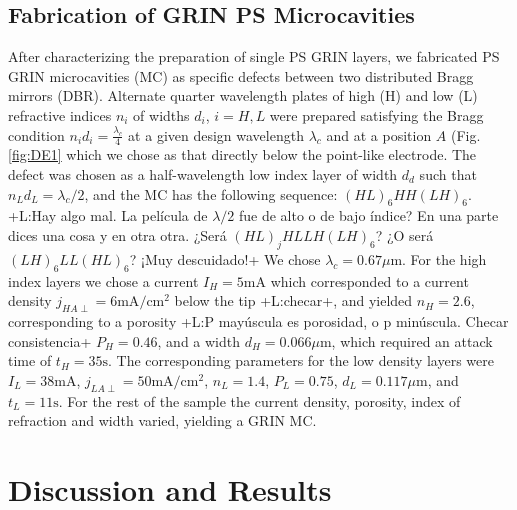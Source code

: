 \documentclass{article}
\newcommand{\notaL}[1]{{\color{blue}+L:#1+}}
\begin{document}
\subsection{Fabrication  of GRIN PS Microcavities}
After characterizing the preparation of single PS GRIN layers, we
fabricated PS GRIN microcavities (MC) as specific defects between two distributed Bragg
mirrors  (DBR). Alternate quarter wavelength plates of high (H) and low (L)
refractive indices $n_i$ of widths $d_i$, $i=H,L$ were prepared satisfying the Bragg condition
$n_id_i=\frac{\lambda_c}{4}$ at a given design
wavelength $\lambda_c$ and at a position $A$ (Fig. \ref{fig:DE1} which
we chose as that directly below the point-like electrode. The defect
was chosen as a half-wavelength low index layer of width $d_d$ such that
$n_Ld_L=\lambda_c/2$, and the MC has the
following sequence: $(HL)_6HH(LH )_6$. \notaL{Hay algo mal. La
  película de $\lambda/2$ fue de alto o de bajo índice? En una parte
  dices una cosa y en otra otra. ¿Será $(HL)_jHLLH(LH)_6$? ¿O será
  $(LH)_6LL(HL)_6$? ¡Muy descuidado!}
We chose $\lambda_c= 0.67 \mu\text{m}$. For the high index layers we
chose a current $I_H=5\text{mA}$ which corresponded to a current density
$j_{HA\perp}= 6\text{mA}/\text{cm}^2$ below the tip \notaL{checar}, and yielded
$n_H =2.6$, corresponding to a porosity \notaL{P mayúscula
  es porosidad, o p minúscula. Checar consistencia} $P_H =0.46$, and a
width $d_H=0.066 \mu\text{m}$, which required an attack time of
$t_H=35 \text{s}$. The corresponding parameters for the low density
layers were $I_L=38\text{mA}$, $j_{LA\perp}=50\text{mA}/\text{cm}^2$, $n_L= 1.4$,  $P_L =0.75$,
$d_L=0.117 \mu \text{m}$, and $t_L=11 \text{s}$. For the rest of the
sample the current density, porosity, index of refraction and width
varied, yielding a GRIN MC.

\section{Discussion and Results}
\end{document}
